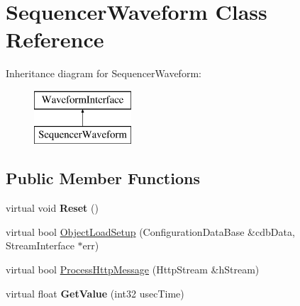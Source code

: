 \hypertarget{classSequencerWaveform}{
\section{SequencerWaveform Class Reference}
\label{classSequencerWaveform}
}
Inheritance diagram for SequencerWaveform:\begin{figure}[H]
\begin{center}
\leavevmode
\includegraphics[height=2.000000cm]{classSequencerWaveform}
\end{center}
\end{figure}
\subsection*{Public Member Functions}
\begin{DoxyCompactItemize}
\item 
\hypertarget{classSequencerWaveform_a5e0baeafd599b64460e85cec2320155d}{
virtual void {\bfseries Reset} ()}
\label{classSequencerWaveform_a5e0baeafd599b64460e85cec2320155d}

\item 
virtual bool \hyperlink{classSequencerWaveform_a866ae8324e1e035eac1d99ca73efd587}{ObjectLoadSetup} (ConfigurationDataBase \&cdbData, StreamInterface $\ast$err)
\item 
virtual bool \hyperlink{classSequencerWaveform_a72ad2420ff153ff20d66399a2a59dbc6}{ProcessHttpMessage} (HttpStream \&hStream)
\item 
\hypertarget{classSequencerWaveform_a70e5009fba42d9fde521879ecfbcf5c8}{
virtual float {\bfseries GetValue} (int32 usecTime)}
\label{classSequencerWaveform_a70e5009fba42d9fde521879ecfbcf5c8}

\end{DoxyCompactItemize}


